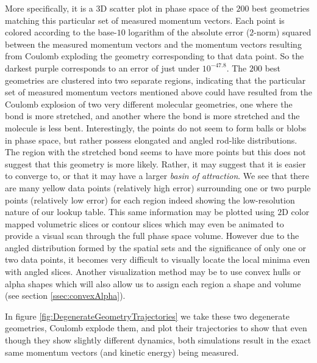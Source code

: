 More specifically, it is a $3$D scatter plot in phase space of the $200$ best geometries matching this particular set of measured momentum vectors. Each point is colored according to the base-$10$ logarithm of the absolute error ($2$-norm) squared between the measured momentum vectors and the momentum vectors resulting from Coulomb exploding the geometry corresponding to that data point. So the darkest purple corresponds to an error of just under $10^{-47.8}$. The $200$ best geometries are clustered into two separate regions, indicating that the particular set of measured momentum vectors mentioned above could have resulted from the Coulomb explosion of two very different molecular geometries, one where the  bond is more stretched, and another where the  bond is more stretched and the molecule is less bent. Interestingly, the points do not seem to form balls or blobs in phase space, but rather possess elongated and angled rod-like distributions. The region with the stretched  bond seems to have more points but this does not suggest that this geometry is more likely. Rather, it may suggest that it is easier to converge to, or that it may have a larger \emph{basin of attraction}. We see that there are many yellow data points (relatively high error) surrounding one or two purple points (relatively low error) for each region indeed showing the low-resolution nature of our lookup table. This same information may be plotted using $2$D color mapped volumetric slices or contour slices which may even be animated to provide a visual scan through the full phase space volume. However due to the angled distribution formed by the spatial sets and the significance of only one or two data points, it becomes very difficult to visually locate the local minima even with angled slices. Another visualization method may be to use convex hulls or alpha shapes which will also allow us to assign each region a shape and volume (see section \ref{ssec:convexAlpha}).

In figure \ref{fig:DegenerateGeometryTrajectories} we take these two degenerate geometries, Coulomb explode them, and plot their trajectories to show that even though they show slightly different dynamics, both simulations result in the exact same momentum vectors (and kinetic energy) being measured.

